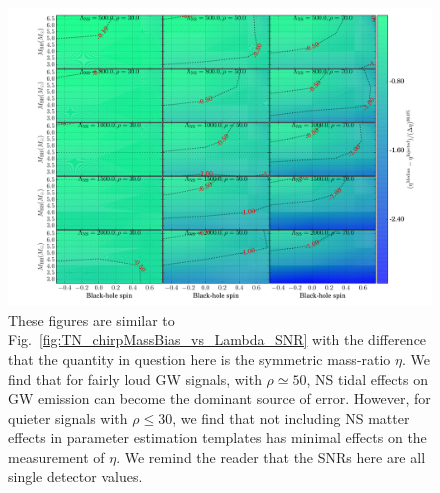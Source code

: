 \documentclass[aps,prd,amsmath,floats,floatfix, twocolumn,
superscriptaddress,nofootinbib,showpacs]{revtex4-1}
\begin{document}
\begin{figure}[!t]
\centering    
\includegraphics[trim={1.3cm 0 0 0},width=2.\columnwidth]{plots/TNEtaBiasesOverCIWidths_CI90_0_Lambda_SNR30_70_linear002}
\caption{These figures are similar to Fig.~\ref{fig:TN_chirpMassBias_vs_Lambda_SNR}
with the difference that the quantity in question here is the symmetric 
mass-ratio $\eta$. We find that for fairly loud GW signals, with $\rho\simeq 50$,
NS tidal effects on GW emission can become the dominant source of error. However,
for quieter signals with $\rho\leq 30$, we find that not including NS matter 
effects in parameter estimation templates has minimal effects on the measurement
of $\eta$. We remind the reader that the SNRs here are all single detector values.
}
\label{fig:TN_EtaBias_vs_Lambda_SNR}
\end{figure}
% 
% 
\end{document}
